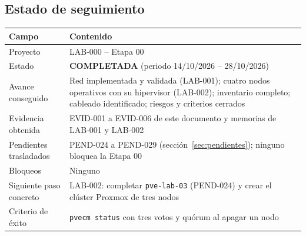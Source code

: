 \documentclass[11pt,a4paper]{article}
\newcommand{\estadobase}[2]{\textcolor{#1}{\textbf{\footnotesize #2}}}
\newcommand{\compl}{\estadobase{okgreen}{COMPLETADA}}
\begin{document}
\subsection{Estado de seguimiento}
\begin{tabularx}{\textwidth}{L{4.2cm} Z}
  \toprule
  \textbf{Campo} & \textbf{Contenido}\\
  \midrule
  Proyecto & LAB-000 -- Etapa 00\\
  Estado & \compl{} (periodo 14/10/2026 -- 28/10/2026)\\
  Avance conseguido & Red implementada y validada (LAB-001); cuatro nodos operativos con su hipervisor (LAB-002); inventario completo; cableado identificado; riesgos y criterios cerrados\\
  Evidencia obtenida & EVID-001 a EVID-006 de este documento y memorias de LAB-001 y LAB-002\\
  Pendientes trasladados & PEND-024 a PEND-029 (sección~\ref{sec:pendientes}); ninguno bloquea la Etapa 00\\
  Bloqueos & Ninguno\\
  Siguiente paso concreto & LAB-002: completar \texttt{pve-lab-03} (PEND-024) y crear el clúster Proxmox de tres nodos\\
  Criterio de éxito & \texttt{pvecm status} con tres votos y quórum al apagar un nodo\\
  \bottomrule
\end{tabularx}

\end{document}
